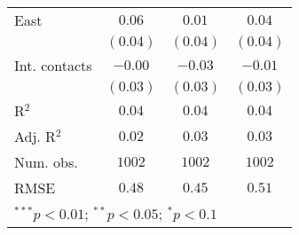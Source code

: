 \begin{table}
\begin{center}
\begin{tabular}{l c c c}
East          & $0.06$        & $0.01$        & $0.04$        \\
              & $(0.04)$      & $(0.04)$      & $(0.04)$      \\
Int. contacts & $-0.00$       & $-0.03$       & $-0.01$       \\
              & $(0.03)$      & $(0.03)$      & $(0.03)$      \\
\midrule
R$^2$         & $0.04$        & $0.04$        & $0.04$        \\
Adj. R$^2$    & $0.02$        & $0.03$        & $0.03$        \\
Num. obs.     & $1002$        & $1002$        & $1002$        \\
RMSE          & $0.48$        & $0.45$        & $0.51$        \\
\bottomrule
\multicolumn{4}{l}{\scriptsize{$^{***}p<0.01$; $^{**}p<0.05$; $^{*}p<0.1$}}
\end{tabular}
\label{tab_host_week}
\end{center}
\end{table}
